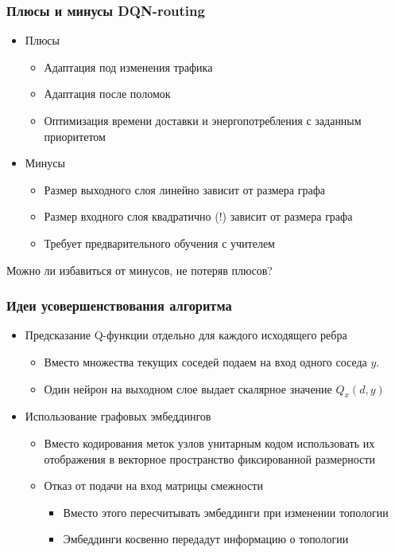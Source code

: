 \documentclass{beamer}
\begin{document}

\begin{frame}
  \frametitle{Плюсы и минусы DQN-routing}
  \begin{itemize}
  \item Плюсы
    \begin{itemize}
    \item Адаптация под изменения трафика
    \item Адаптация после поломок
    \item Оптимизация времени доставки и энергопотребления с заданным приоритетом
    \end{itemize}
  \item Минусы
    \begin{itemize}
    \item Размер выходного слоя линейно зависит от размера графа
    \item Размер входного слоя квадратично (!) зависит от размера графа
    \item Требует предварительного обучения с учителем
    \end{itemize}
  \end{itemize}
  Можно ли избавиться от минусов, не потеряв плюсов?
\end{frame}


\begin{frame}
  \frametitle{Идеи усовершенствования алгоритма}
  \begin{itemize}
  \item Предсказание Q-функции отдельно для каждого исходящего ребра
    \begin{itemize}
    \item Вместо множества текущих соседей подаем на вход одного соседа $y$.
    \item Один нейрон на выходном слое выдает скалярное значение $Q_x(d, y)$
    \end{itemize}

  \item Использование графовых эмбеддингов
    \begin{itemize}
    \item Вместо кодирования меток узлов унитарным кодом использовать их
      отображения в векторное пространство фиксированной размерности
    \item Отказ от подачи на вход матрицы смежности
      \begin{itemize}
      \item Вместо этого пересчитывать эмбеддинги при изменении топологии
      \item Эмбеддинги косвенно передадут информацию о топологии
      \end{itemize}
    \end{itemize}
  \end{itemize}
\end{frame}
\end{document}
